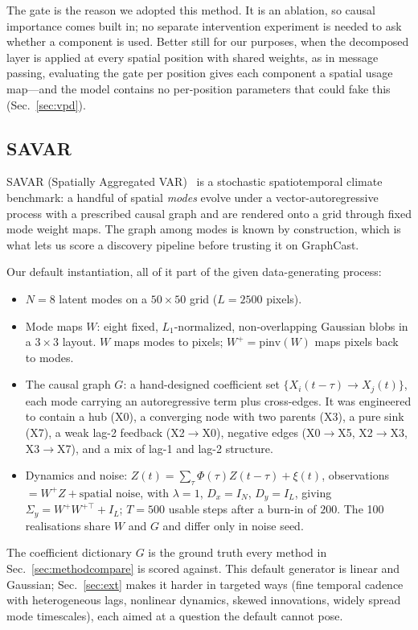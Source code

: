 The gate is the reason we adopted this method. It is an ablation, so causal
importance comes built in; no separate intervention experiment is needed to ask
whether a component is used. Better still for our purposes, when the decomposed
layer is applied at every spatial position with shared weights, as in message
passing, evaluating the gate per position gives each component a spatial usage
map---and the model contains no per-position parameters that could fake this
(Sec.~\ref{sec:vpd}).

\subsection{SAVAR}

SAVAR (Spatially Aggregated VAR)~\cite{savar} is a stochastic spatiotemporal
climate benchmark: a handful of spatial \emph{modes} evolve under a
vector-autoregressive process with a prescribed causal graph and are rendered onto
a grid through fixed mode weight maps. The graph among modes is known by
construction, which is what lets us score a discovery pipeline before trusting it
on GraphCast.

Our default instantiation, all of it part of the given data-generating process:
\begin{itemize}[nosep]
  \item $N=8$ latent modes on a $50\times50$ grid ($L=2500$ pixels).
  \item Mode maps $W$: eight fixed, $L_1$-normalized, non-overlapping Gaussian
        blobs in a $3\times3$ layout. $W$ maps modes to pixels;
        $W^{+}=\mathrm{pinv}(W)$ maps pixels back to modes.
  \item The causal graph $G$: a hand-designed coefficient set
        $\{X_i(t-\tau)\!\to\!X_j(t)\}$, each mode carrying an autoregressive term
        plus cross-edges. It was engineered to contain a hub (X0), a converging
        node with two parents (X3), a pure sink (X7), a weak lag-2 feedback
        (X2$\to$X0), negative edges (X0$\to$X5, X2$\to$X3, X3$\to$X7), and a mix of
        lag-1 and lag-2 structure.
  \item Dynamics and noise: $Z(t)=\sum_\tau \Phi(\tau)Z(t-\tau)+\xi(t)$,
        observations $=W^{+}Z+\text{spatial noise}$, with $\lambda=1$, $D_x=I_N$,
        $D_y=I_L$, giving $\Sigma_y=W^{+}W^{+\top}+I_L$; $T=500$ usable steps after
        a burn-in of $200$. The 100 realisations share $W$ and $G$ and differ only
        in noise seed.
\end{itemize}
The coefficient dictionary $G$ is the ground truth every method in
Sec.~\ref{sec:methodcompare} is scored against. This default generator is linear
and Gaussian; Sec.~\ref{sec:ext} makes it harder in targeted ways (fine temporal
cadence with heterogeneous lags, nonlinear dynamics, skewed innovations, widely
spread mode timescales), each aimed at a question the default cannot pose.
